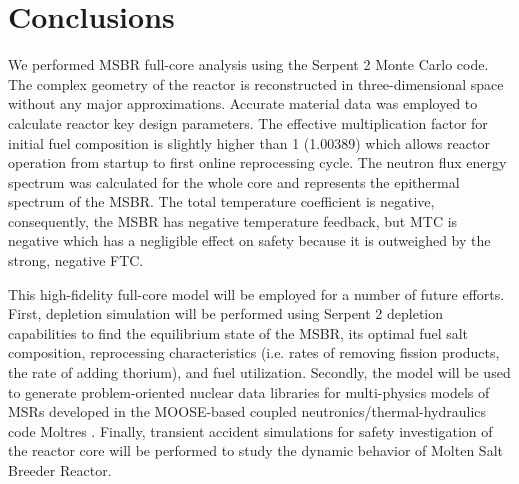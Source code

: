 \documentclass{anstrans}
\begin{document}
\section{Conclusions}
We performed \gls{MSBR} full-core analysis using the Serpent 2 Monte Carlo code. The complex geometry of the reactor is reconstructed in three-dimensional space without any major approximations. Accurate material data was employed to calculate reactor key design parameters. The effective multiplication factor for initial fuel composition is slightly higher than 1 (1.00389) which allows reactor operation from startup to first online reprocessing cycle. The neutron flux energy spectrum was calculated for the whole core and represents the epithermal spectrum of the MSBR. The total temperature coefficient is negative, consequently, the MSBR has negative temperature feedback, but MTC is negative which has a negligible effect on safety because it is outweighed by the strong, negative FTC.

This high-fidelity full-core model will be employed for a number of future 
efforts. First, depletion simulation will be performed using Serpent 2 depletion capabilities to find the equilibrium state of the MSBR, its optimal fuel salt composition, reprocessing characteristics (i.e. rates of removing fission products, the rate of adding thorium), and fuel utilization. Secondly, the model will be used to generate problem-oriented nuclear data libraries for multi-physics models of \glspl{MSR} developed in the MOOSE-based coupled neutronics/thermal-hydraulics code Moltres \cite{lindsay_arfc/moltres:_2017}. Finally, transient accident simulations for safety investigation of the reactor core will be performed to study the dynamic behavior of Molten Salt Breeder Reactor. 




\end{document}
